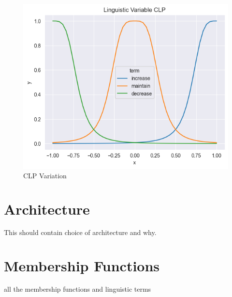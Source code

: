 \documentclass[11pt]{report}
\begin{document}
\begin{figure}[htbp]
\begin{minipage}{0.32\textwidth}
    \end{minipage}
    \hfill
    \begin{minipage}{0.32\textwidth}
        \centering
        \includegraphics[width=\textwidth]{../images/first_bell/CLP}
        \caption{CLP Variation}
        \label{fig:first_bell_clp}
    \end{minipage}
\end{figure}



\section{Architecture}
This should contain choice of architecture and why.

\section{Membership Functions}
all the membership functions and linguistic terms

\begin{figure}

\end{figure}
\end{document}

